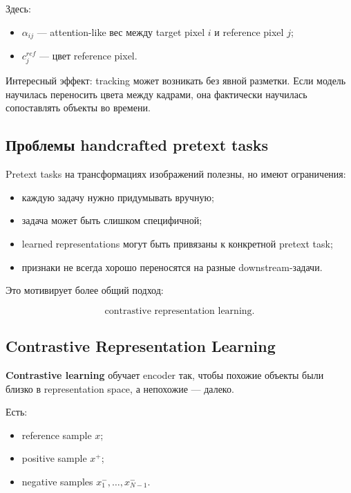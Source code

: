 \documentclass[a4paper,12pt]{article}
\begin{document}
Здесь:

\begin{itemize}
    \item \(\alpha_{ij}\) --- attention-like вес между target pixel \(i\) и reference pixel \(j\);
    \item \(c_j^{ref}\) --- цвет reference pixel.
\end{itemize}

Интересный эффект: tracking может возникать без явной разметки. Если модель научилась переносить цвета между кадрами, она фактически научилась сопоставлять объекты во времени.

\subsection{Проблемы handcrafted pretext tasks}

Pretext tasks на трансформациях изображений полезны, но имеют ограничения:

\begin{itemize}
    \item каждую задачу нужно придумывать вручную;
    \item задача может быть слишком специфичной;
    \item learned representations могут быть привязаны к конкретной pretext task;
    \item признаки не всегда хорошо переносятся на разные downstream-задачи.
\end{itemize}

Это мотивирует более общий подход:

\[
\text{contrastive representation learning}.
\]

\subsection{Contrastive Representation Learning}

\textbf{Contrastive learning} обучает encoder так, чтобы похожие объекты были близко в representation space, а непохожие --- далеко.

Есть:

\begin{itemize}
    \item reference sample \(x\);
    \item positive sample \(x^+\);
    \item negative samples \(x^-_1,\dots,x^-_{N-1}\).
\end{itemize}
\end{document}
